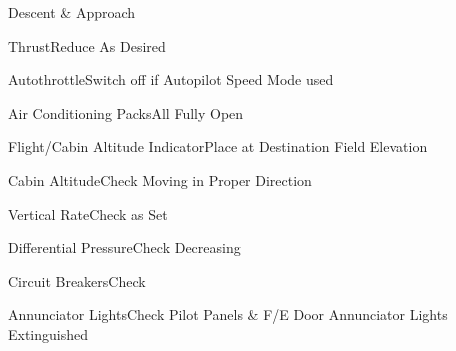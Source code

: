 \documentclass[sim-use, blue_items]{checklist}
\begin{document}
\begin{checklist}{Descent \& Approach}
	\item{Thrust}{Reduce As Desired}
	\item{Autothrottle}{Switch off if Autopilot Speed Mode used}
	\item{Air Conditioning Packs}{All Fully Open}
	\item{Flight/Cabin Altitude Indicator}{Place at Destination Field Elevation}
	\item{Cabin Altitude}{Check Moving in Proper Direction}
	\item{Vertical Rate}{Check as Set}
	\item{Differential Pressure}{Check Decreasing}
	\item{Circuit Breakers}{Check}
	\item{Annunciator Lights}{Check Pilot Panels \& F/E Door Annunciator Lights Extinguished}
\end{checklist}
\end{document}
